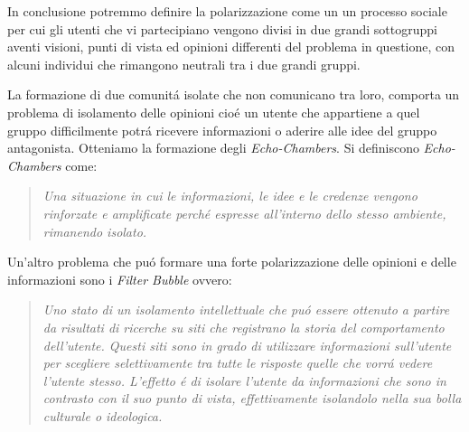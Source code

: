 In conclusione potremmo definire la polarizzazione come un un processo sociale per cui gli utenti che vi partecipiano vengono divisi in due grandi sottogruppi aventi visioni, punti di vista ed opinioni differenti del problema in questione, con alcuni individui che rimangono neutrali tra i due grandi gruppi.

La formazione di due comunit\'a isolate che non comunicano tra loro, comporta un problema di isolamento delle opinioni
cio\'e un utente che appartiene a quel gruppo difficilmente potr\'a ricevere informazioni o aderire alle idee del gruppo antagonista.
Otteniamo  la formazione degli \textit{Echo-Chambers}. Si definiscono \textit{Echo-Chambers} come:
\begin{quote} 
\textit{Una situazione in cui le informazioni, le idee e le credenze vengono rinforzate e amplificate perch\'e espresse all'interno dello stesso ambiente, rimanendo isolato.}
\end{quote}

Un'altro problema che pu\'o formare una forte polarizzazione delle opinioni e delle informazioni sono i \textit{Filter Bubble} ovvero:

\begin{quote} 
\textit{Uno stato di un isolamento intellettuale che pu\'o essere ottenuto a partire da risultati di ricerche su siti che registrano la storia del comportamento dell'utente. Questi siti sono in grado di utilizzare informazioni sull'utente per scegliere selettivamente tra tutte le risposte quelle che vorr\'a vedere l'utente stesso. L'effetto \'e di isolare l'utente da informazioni che sono in contrasto con il suo punto di vista, effettivamente isolandolo nella sua bolla culturale o ideologica.}
\end{quote}

